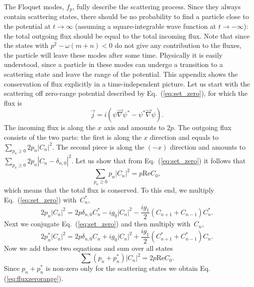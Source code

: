 The Floquet modes, $f_p$, fully describe the scattering process. Since they always contain scattering states, there should be no probability to find a particle close to the potential at $t\to\infty$ (assuming a square-integrable wave function at $t\to-\infty$): the total outgoing flux should be equal to the total incoming flux. Note that since the states with $p^2-\omega(m+n)<0$ do not give any contribution to the fluxes, the particle will leave these modes after some time. Physically it is easily understood, since a particle in these modes can undergo a transition to a scattering state and leave the range of the potential. This appendix 
shows the conservation of flux explicitly in a time-independent picture. Let us start with the scattering off zero-range potential described by Eq.~(\ref{eq:set_zero}), for which the flux is 
\begin{equation}
\vec j = i (\psi \vec \nabla \psi^*-\psi^* \vec \nabla \psi).
\end{equation}
The incoming flux is along the $x$ axis and amounts to $2p$.
The outgoing flux consists of the two parts: the first is along the $x$ direction and equals to $\sum_{p_n\geq0} 2p_n|C_n|^2$. The second piece is along the $(-x)$
 direction and amounts to $\sum_{p_n\geq0} 2 p_n |C_n-\delta_{n,0}|^2$. Let us show that from Eq.~(\ref{eq:set_zero}) it follows that 
\begin{equation}
\sum_{p_n\geq 0}p_n|C_n|^2=p \mathrm{Re} C_0,
\label{eq:fluxzerorange}
\end{equation}
which means that the total flux is conserved. To this end, we multiply
Eq.~(\ref{eq:set_zero}) with~$C_n^{*}$,
\begin{equation}
2 p_n |C_n|^2=2p\delta_{n,0} C_n^*-ig_0 |C_n|^2 - \frac{i g_1}{2}(C_{n+1}+C_{n-1})C_n^*.
\end{equation}
Next we conjugate Eq.~(\ref{eq:set_zero}) and then multiply
with~$C_n$,
\begin{equation}
2 p_n^* |C_n|^2=2p\delta_{n,0} C_n+ig_0 |C_n|^2 + \frac{i g_1}{2}(C^*_{n+1}+C^*_{n-1})C_n.
\end{equation}
Now we add these two equations and sum over all states
\begin{equation}
\sum (p_n+p_n^*)|C_n|^2=2p \mathrm{Re} C_0.
\end{equation}
Since $p_n+p_n^*$ is non-zero only for the scattering states we obtain Eq. (\ref{eq:fluxzerorange}). 
